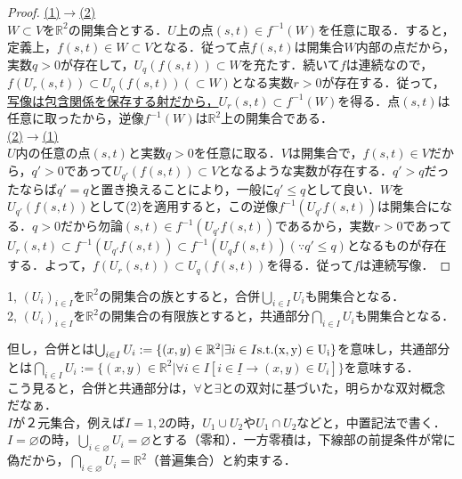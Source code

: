 \documentclass[uplatex, 12pt, dvipdfmx]{jsreport}
\begin{document}
\begin{proof}
    \underline{(1)$\rightarrow$(2)}\\
    $W\subset V$を$\mathbb{R}^2$の開集合とする．$U$上の点$(s,t)\in f^{-1}(W)$を任意に取る．すると，定義上，$f(s,t)\in W\subset V$となる．従って点$f(s,t)$は開集合$W$内部の点だから，実数$q>0$が存在して，$U_q(f(s,t))\subset W$を充たす．続いて$f$は連続なので，$f(U_r(s,t))\subset U_q(f(s,t))(\subset W)$となる実数$r>0$が存在する．従って，\underline{写像は包含関係を保存する射だから，}$U_r(s,t)\subset f^{-1}(W)$を得る．点$(s,t)$は任意に取ったから，逆像$f^{-1}(W)$は$\mathbb{R}^2$上の開集合である．\\
    \underline{(2)$\rightarrow$(1)}\\
    $U$内の任意の点$(s,t)$と実数$q>0$を任意に取る．$V$は開集合で，$f(s,t)\in V$だから，$q'>0$であって$U_{q'}(f(s,t))\subset V$となるような実数が存在する．$q'>q$だったならば$q'=q$と置き換えることにより，一般に$q'\le q$として良い．$W$を$U_{q'}(f(s,t))$として(2)を適用すると，この逆像$f^{-1}(U_{q'}f(s,t))$は開集合になる．$q>0$だから勿論$(s,t)\in f^{-1}(U_{q'}f(s,t))$であるから，実数$r>0$であって$U_r(s,t)\subset f^{-1}(U_{q'}f(s,t)) \subset f^{-1}(U_{q}f(s,t)) (\because q'\le q)$となるものが存在する．よって，$f(U_r(s,t))\subset U_q(f(s,t))$を得る．従って$f$は連続写像．
\end{proof}

\begin{shadebox}\begin{proposition}[Euclid空間の開集合の集合演算に対する性質]\label{proposition1}
    1, $(U_i)_{i\in I}$を$\mathbb{R}^2$の開集合の族とすると，合併$\bigcup_{i\in I}U_i$も開集合となる．\\
    2, $(U_i)_{i\in I}$を$\mathbb{R}^2$の開集合の有限族とすると，共通部分$\bigcap_{i\in I}U_i$も開集合となる．\\
\end{proposition}\end{shadebox}

但し，合併とは$\bigcup_{i\in I}U_i := \{ (x,y)\in\mathbb{R}^2 | \exists i\in I \rm{s.t.} (x,y)\in U_i \}$を意味し，共通部分とは$\bigcap_{i\in I}U_i := \{ (x,y)\in\mathbb{R}^2 | \forall i\in I [\underline{i\in I \rightarrow} (x,y)\in U_i ]\}$を意味する．\\
こう見ると，合併と共通部分は，$\forall と \exists$との双対に基づいた，明らかな双対概念だなぁ．\\
$I$が２元集合，例えば$I={1,2}$の時，$U_1 \cup U_2$や$U_1 \cap U_2$などと，中置記法で書く．$I=\varnothing$の時，$\bigcup_{i\in\varnothing}U_i = \varnothing$とする（零和）．一方零積は，下線部の前提条件が常に偽だから，$\bigcap_{i\in\varnothing}U_i = \mathbb{R}^2$（普遍集合）と約束する．\\
\end{document}
